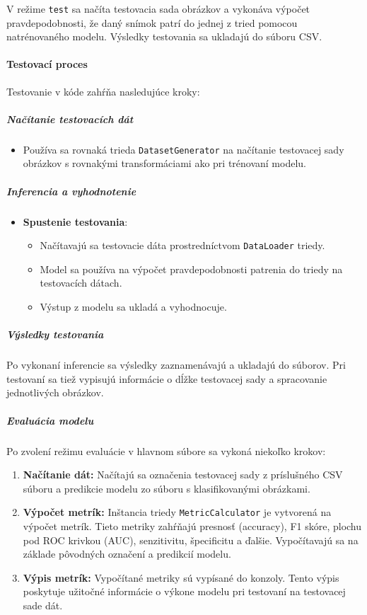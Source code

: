 \documentclass[a4paper, 11pt]{article}
\begin{document}
V režime \texttt{test} sa načíta testovacia sada obrázkov a vykonáva výpočet pravdepodobnosti, že daný snímok patrí do jednej z tried pomocou natrénovaného modelu. Výsledky testovania sa ukladajú do súboru CSV.

\paragraph{Testovací proces}

Testovanie v kóde zahŕňa nasledujúce kroky:

\subparagraph{Načítanie testovacích dát}
\begin{itemize}
    \item Používa sa rovnaká trieda \texttt{DatasetGenerator} na načítanie testovacej sady obrázkov s rovnakými transformáciami ako pri trénovaní modelu.
\end{itemize}

\subparagraph{Inferencia a vyhodnotenie}
\begin{itemize}
    \item \textbf{Spustenie testovania}:
    \begin{itemize}
        \item Načítavajú sa testovacie dáta prostredníctvom \texttt{DataLoader} triedy.
        \item Model sa používa na výpočet pravdepodobnosti patrenia do triedy na testovacích dátach.
        \item Výstup z modelu sa ukladá a vyhodnocuje.
    \end{itemize}
\end{itemize}

\subparagraph{Výsledky testovania}
Po vykonaní inferencie sa výsledky zaznamenávajú a ukladajú do súborov. Pri testovaní sa tiež vypisujú informácie o dĺžke testovacej sady a spracovanie jednotlivých obrázkov.

\vspace{20px}



\subparagraph*{Evaluácia modelu}

Po zvolení režimu evaluácie v hlavnom súbore sa vykoná niekoľko krokov:

\begin{enumerate}
    \item \textbf{Načítanie dát:} Načítajú sa označenia testovacej sady z príslušného CSV súboru a predikcie modelu zo súboru s klasifikovanými obrázkami.
    
    \item \textbf{Výpočet metrík:} Inštancia triedy \texttt{MetricCalculator} je vytvorená na výpočet metrík. Tieto metriky zahŕňajú presnosť (accuracy), F1 skóre, plochu pod ROC krivkou (AUC), senzitivitu, špecificitu a ďalšie. Vypočítavajú sa na základe pôvodných označení a predikcií modelu.
    
    \item \textbf{Výpis metrík:} Vypočítané metriky sú vypísané do konzoly. Tento výpis poskytuje užitočné informácie o výkone modelu pri testovaní na testovacej sade dát.
\end{enumerate}
\end{document}
